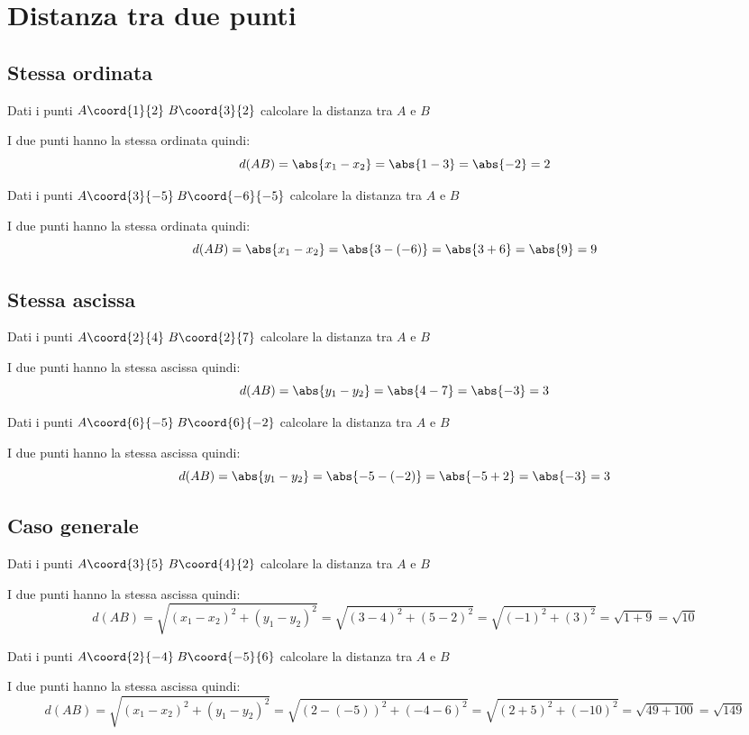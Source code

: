 \chapter{Distanza tra due punti}
\label{cha:DistanzaTraduePunti}
\section{Stessa ordinata}
\begin{esempiot}{}{}
Dati i punti $A\coord{1}{2}$\,$B\coord{3}{2}$ calcolare la distanza tra $A$ e $B$
\end{esempiot}
I due punti hanno la stessa ordinata quindi:
\begin{equation}
d(AB)=\abs{x_1-x_2}=\abs{1-3}=\abs{-2}=2
\end{equation}
\begin{esempiot}{}{}
	Dati i punti $A\coord{3}{-5}$\,$B\coord{-6}{-5}$ calcolare la distanza tra $A$ e $B$
\end{esempiot}
I due punti hanno la stessa ordinata quindi: 
\begin{equation}
d(AB)=\abs{x_1-x_2}=\abs{3-(-6)}=\abs{3+6}=\abs{9}=9
\end{equation}
\section{Stessa ascissa}
\begin{esempiot}{}{}
	Dati i punti $A\coord{2}{4}$\,$B\coord{2}{7}$ calcolare la distanza tra $A$ e $B$
\end{esempiot}
I due punti hanno la stessa ascissa quindi: 
\begin{equation}
d(AB)=\abs{y_1-y_2}=\abs{4-7}=\abs{-3}=3
\end{equation}
\begin{esempiot}{}{}
	Dati i punti $A\coord{6}{-5}$\,$B\coord{6}{-2}$ calcolare la distanza tra $A$ e $B$
\end{esempiot}
I due punti hanno la stessa ascissa quindi: 
\begin{equation}
d(AB)=\abs{y_1-y_2}=\abs{-5-(-2)}=\abs{-5+2}=\abs{-3}=3
\end{equation}
\section{Caso generale}
\begin{esempiot}{}{}
	Dati i punti $A\coord{3}{5}$\,$B\coord{4}{2}$ calcolare la distanza tra $A$ e $B$
\end{esempiot}
I due punti hanno la stessa ascissa quindi: 
\begin{equation}
d(AB)=\sqrt{(x_1-x_2)^2+(y_1-y_2)^2}=\sqrt{(3-4)^2+(5-2)^2}=\sqrt{(-1)^2+(3)^2}=\sqrt{1+9}=\sqrt{10}
\end{equation}
\begin{esempiot}{}{}
	Dati i punti $A\coord{2}{-4}$\,$B\coord{-5}{6}$ calcolare la distanza tra $A$ e $B$
\end{esempiot}
I due punti hanno la stessa ascissa quindi: 
\begin{equation}
d(AB)=\sqrt{(x_1-x_2)^2+(y_1-y_2)^2}=\sqrt{(2-(-5))^2+(-4-6)^2}=\sqrt{(2+5)^2+(-10)^2}=\sqrt{49+100}=\sqrt{149}
\end{equation}
